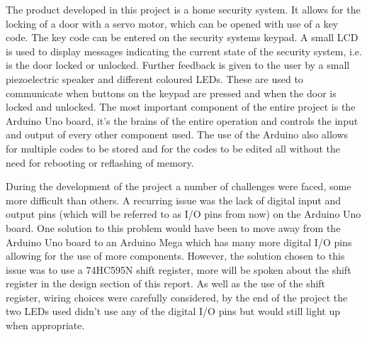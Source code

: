 \documentclass{article}
\begin{document}
  The product developed in this project is a home security system.
  It allows for the locking of a door with a servo motor, which can be opened with use of a key code.
  The key code can be entered on the security systems keypad.
  A small LCD is used to display messages indicating the current state of the security system, i.e. is the door locked or unlocked.
  Further feedback is given to the user by a small piezoelectric speaker and different coloured LEDs.
  These are used to communicate when buttons on the keypad are pressed and when the door is locked and unlocked.
  The most important component of the entire project is the Arduino Uno board, it's the brains of the entire operation and controls the input and output of every other component used.
  The use of the Arduino also allows for multiple codes to be stored and for the codes to be edited all without the need for rebooting or reflashing of memory.

  During the development of the project a number of challenges were faced, some more difficult than others.
  A recurring issue was the lack of digital input and output pins (which will be referred to as I/O pins from now) on the Arduino Uno board.
  One solution to this problem would have been to move away from the Arduino Uno board to an Arduino Mega which has many more digital I/O pins allowing for the use of more components.
  However, the solution chosen to this issue was to use a 74HC595N shift register, more will be spoken about the shift register in the design section of this report.
  As well as the use of the shift register, wiring choices were carefully considered, by the end of the project the two LEDs used didn't use any of the digital I/O pins but would still light up when appropriate.

  
\end{document}
